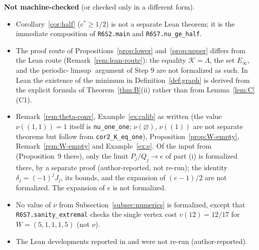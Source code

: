 \documentclass[11pt]{amsart}
\theoremstyle{definition}
\theoremstyle{remark}
\newcommand{\KL}{\mathcal{K}}
\begin{document}
\medskip\noindent\textbf{Not machine-checked} (or checked only in a different form).
\begin{itemize}
\item Corollary~\ref{cor:half} ($c^*\ge1/2$) is not a separate Lean theorem; it is the immediate composition of
\texttt{R6S2.main} and \texttt{R6S7.nu\_ge\_half}.
\item The proof route of Propositions~\ref{prop:lower} and~\ref{prop:upper} differs from the Lean route
(Remark~\ref{rem:lean-route}): the equality $\KL=\Lambda$, the set $E_\infty$, and the periodic-$\limsup$ argument of
Step 9 are not formalized as such. In Lean the existence of the minimum in Definition~\ref{def:graph} is derived
from the explicit formula of Theorem~\ref{thm:B}(ii) rather than from Lemma~\ref{lem:C}(C1).
\item Remark~\ref{rem:theta-conv}, Example~\ref{ex:calib} as written (the value $\nu((1,1))=1$ itself is
\texttt{nu\_one\_one}; $\nu(\varnothing)$, $\nu((1))$ are not separate theorems but follow from
\texttt{cor2\_K\_eq\_one}), Proposition~\ref{prop:W-empty}, Remark~\ref{rem:W-empty} and Example~\ref{ex:e}.
Of the input from \cite{D5} (Proposition~9 there), only the limit $P_j/Q_j\to e$ of part (i) is formalized there,
by a separate proof (author-reported, not re-run); the identity $\delta_j=(-1)^jJ_j$, its bounds, and the
expansion of $(e-1)/2$ are not formalized.
The expansion of $e$ is not formalized.
\item No value of $\nu$ from Subsection~\ref{subsec:numerics} is formalized, except that
\texttt{R6S7.sanity\_extremal} checks the single vertex cost $v(12)=12/17$ for $W=(5,1,1,1,5)$ (not $\nu$).
\item The Lean developments reported in \cite{P2} and \cite{P2E} were not re-run (author-reported).
\end{itemize}

\end{document}
